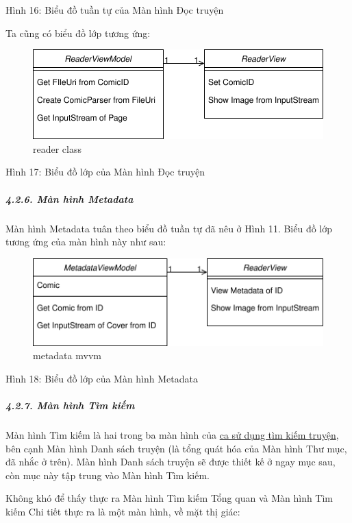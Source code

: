 \documentclass[
]{article}
\begin{document}
Hình 16: Biểu đồ tuần tự của Màn hình Đọc truyện

Ta cũng có biểu đồ lớp tương ứng:

\begin{figure}
\centering
\includegraphics{../images/reader_mvvm_class.svg}
\caption{reader class}
\end{figure}

Hình 17: Biểu đồ lớp của Màn hình Đọc truyện

\hypertarget{muxe0n-huxecnh-metadata}{%
\subparagraph{\texorpdfstring{4.2.6. Màn hình Metadata
}{4.2.6. Màn hình Metadata }}\label{muxe0n-huxecnh-metadata}}

Màn hình Metadata tuân theo biểu đồ tuần tự đã nêu ở Hình 11. Biểu đồ
lớp tương ứng của màn hình này như sau:

\begin{figure}
\centering
\includegraphics{../images/metadata_mvvm_class.svg}
\caption{metadata mvvm}
\end{figure}

Hình 18: Biểu đồ lớp của Màn hình Metadata

\hypertarget{muxe0n-huxecnh-tuxecm-kiux1ebfm}{%
\subparagraph{\texorpdfstring{4.2.7. Màn hình Tìm kiếm
}{4.2.7. Màn hình Tìm kiếm }}\label{muxe0n-huxecnh-tuxecm-kiux1ebfm}}

Màn hình Tìm kiếm là hai trong ba màn hình của
\protect\hyperlink{P3.3.5-search-comic}{ca sử dụng tìm kiếm truyện}, bên
cạnh Màn hình Danh sách truyện (là tổng quát hóa của Màn hình Thư mục,
đã nhắc ở trên). Màn hình Danh sách truyện sẽ được thiết kế ở ngay mục
sau, còn mục này tập trung vào Màn hình Tìm kiếm.

Không khó để thấy thực ra Màn hình Tìm kiếm Tổng quan và Màn hình Tìm
kiếm Chi tiết thực ra là một màn hình, về mặt thị giác:
\end{document}
